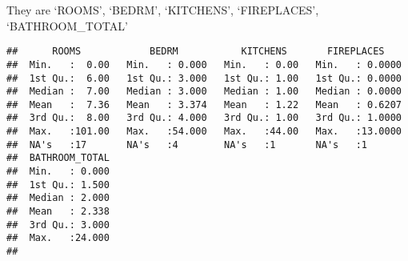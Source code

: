 \documentclass[]{article}
\newenvironment{Shaded}{\begin{snugshade}}{\end{snugshade}}
\newcommand{\CommentTok}[1]{\textcolor[rgb]{0.56,0.35,0.01}{\textit{#1}}}
\newcommand{\DataTypeTok}[1]{\textcolor[rgb]{0.13,0.29,0.53}{#1}}
\newcommand{\KeywordTok}[1]{\textcolor[rgb]{0.13,0.29,0.53}{\textbf{#1}}}
\newcommand{\NormalTok}[1]{#1}
\newcommand{\OperatorTok}[1]{\textcolor[rgb]{0.81,0.36,0.00}{\textbf{#1}}}
\newcommand{\StringTok}[1]{\textcolor[rgb]{0.31,0.60,0.02}{#1}}
\begin{document}
They are `ROOMS', `BEDRM', `KITCHENS', `FIREPLACES', `BATHROOM\_TOTAL'

\begin{Shaded}
\end{Shaded}

\begin{verbatim}
##      ROOMS            BEDRM           KITCHENS       FIREPLACES     
##  Min.   :  0.00   Min.   : 0.000   Min.   : 0.00   Min.   : 0.0000  
##  1st Qu.:  6.00   1st Qu.: 3.000   1st Qu.: 1.00   1st Qu.: 0.0000  
##  Median :  7.00   Median : 3.000   Median : 1.00   Median : 0.0000  
##  Mean   :  7.36   Mean   : 3.374   Mean   : 1.22   Mean   : 0.6207  
##  3rd Qu.:  8.00   3rd Qu.: 4.000   3rd Qu.: 1.00   3rd Qu.: 1.0000  
##  Max.   :101.00   Max.   :54.000   Max.   :44.00   Max.   :13.0000  
##  NA's   :17       NA's   :4        NA's   :1       NA's   :1        
##  BATHROOM_TOTAL  
##  Min.   : 0.000  
##  1st Qu.: 1.500  
##  Median : 2.000  
##  Mean   : 2.338  
##  3rd Qu.: 3.000  
##  Max.   :24.000  
## 
\end{verbatim}

\begin{Shaded}
\end{Shaded}
\end{document}
